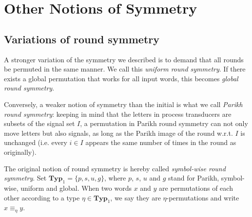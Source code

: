 \chapter{Other Notions of Symmetry}
\label{chap:other_notions}

\section{Variations of round symmetry}
\newcommand{\RSTYPES}{\ensuremath{\mathbf{Typ}_1}}
\newcommand{\RSTUPS}{\ensuremath{\mathbf{Typ}_2}}

A stronger variation of the symmetry we described is to demand that all rounds be permuted in the same manner. We call this \emph{uniform round symmetry}. If there exists a global permutation that works for all input words, this becomes \emph{global round symmetry}.

Conversely, a weaker notion of symmetry than the initial is what we call \emph{Parikh round symmetry}: keeping in mind that the letters in process transducers are subsets of the signal set $I$, a permutation in Parikh round symmetry can not only move letters but also signals, as long as the Parikh image of the round w.r.t.\! $I$ is unchanged (i.e. every $i\in I$ appears the same number of times in the round as originally).

The original notion of round symmetry is hereby called \emph{symbol-wise round symmetry}.
Set $\RSTYPES=\{p, s, u, g\}$, where $p$, $s$, $u$ and $g$ stand for Parikh, symbol-wise, uniform and global. When two words $x$ and $y$ are permutations of each other according to a type $\eta \in \RSTYPES$, we say they are $\eta$-permutations and write $x\equiv_\eta y$.


